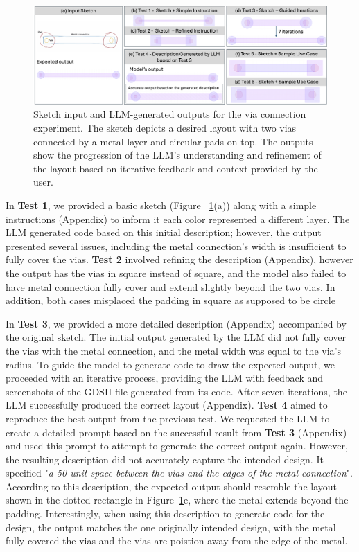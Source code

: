 \documentclass{article}
\begin{document}
\begin{figure}[!h]
\centering
\includegraphics[width=1\linewidth]{Figure1_v5.png}
\caption{Sketch input and LLM-generated outputs for the via connection experiment. The sketch depicts a desired layout with two vias connected by a metal layer and circular pads on top. The outputs show the progression of the LLM's understanding and refinement of the layout based on iterative feedback and context provided by the user.}
\label{fig:via_experiment}
\end{figure}
In \textbf{Test 1}, we provided a basic sketch (Figure ~\ref{fig:via_experiment}(a)) along with a simple instructions (Appendix) to inform it each color represented a different layer. The LLM generated code based on this initial description; however, the output presented several issues, including the metal connection's width is insufficient to fully cover the vias. \textbf{Test 2} involved refining the description (Appendix), however the output has the vias in square instead of square, and the model also failed to have metal connection fully cover and extend slightly beyond the two vias. In addition, both cases misplaced the padding in square as supposed to be circle 

In \textbf{Test 3}, we provided a more detailed description (Appendix) accompanied by the original sketch. The initial output generated by the LLM did not fully cover the vias with the metal connection, and the metal width was equal to the via's radius. To guide the model to generate code to draw the expected output, we proceeded with an iterative process, providing the LLM with feedback and screenshots of the GDSII file generated from its code. After seven iterations, the LLM successfully produced the correct layout (Appendix). \textbf{Test 4} aimed to reproduce the best output from the previous test. We requested the LLM to create a detailed prompt based on the successful result from \textbf{Test 3} (Appendix) and used this prompt to attempt to generate the correct output again. However, the resulting description did not accurately capture the intended design. It specified "\textit{a 50-unit space between the vias and the edges of the metal connection}". According to this description, the expected output should resemble the layout shown in the dotted rectangle in Figure~\ref{fig:via_experiment}e, where the metal extends beyond the padding. Interestingly, when using this description to generate code for the design, the output matches the one originally intended design, with the metal fully covered the vias and the vias are poistion away from the edge of the metal. 
\end{document}
